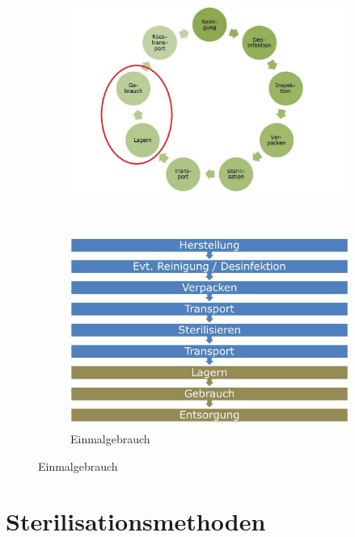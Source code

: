 \begin{figure}
	\centering
	\begin{subfigure}[b]{0.4\textwidth}
		\includegraphics[width=\textwidth]{fig/insturmentenkreislauf}
		\caption[Wiederverwendbare Instrumente]{}
		\label{fig:insturmentenkreislauf}
	\end{subfigure}
	~ 
	\begin{subfigure}[b]{0.4\textwidth}
		\includegraphics[width=\textwidth]{fig/einmalgebrauch}
		\caption{Einmalgebrauch}
		\label{fig:einmalgebrauch}
	\end{subfigure}

\end{figure}

\section{Sterilisationsmethoden}


